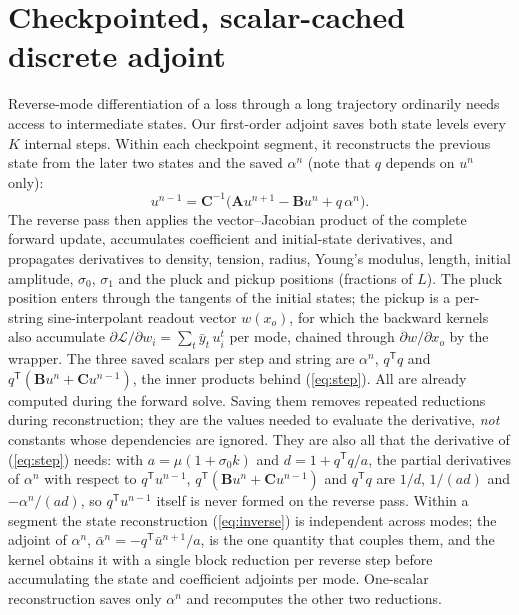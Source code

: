 \documentclass[a4paper,10pt]{article}
\begin{document}
\section{Checkpointed, scalar-cached discrete adjoint}
Reverse-mode differentiation of a loss through a long trajectory ordinarily needs access to intermediate states. Our first-order adjoint saves both state levels every $K$ internal steps. Within each checkpoint segment, it reconstructs the previous state from the later two states and the saved $\alpha^n$ (note that $q$ depends on $u^{n}$ only):
\begin{equation}
 u^{n-1}=\mathbf{C}^{-1}\big(\mathbf{A}u^{n+1}-\mathbf{B}u^{n}+q\,\alpha^n\big).
 \label{eq:inverse}
\end{equation}
The reverse pass then applies the vector--Jacobian product of the complete forward update, accumulates coefficient and initial-state derivatives, and propagates derivatives to density, tension, radius, Young's modulus, length, initial amplitude, $\sigma_0$, $\sigma_1$ and the pluck and pickup positions (fractions of $L$). The pluck position enters through the tangents of the initial states; the pickup is a per-string sine-interpolant readout vector $w(x_o)$, for which the backward kernels also accumulate $\partial\mathcal{L}/\partial w_i=\sum_t\bar y_t\,u_i^t$ per mode, chained through $\partial w/\partial x_o$ by the wrapper. The three saved scalars per step and string are $\alpha^n$, $q^{\mathsf T}q$ and $q^{\mathsf T}(\mathbf{B}u^{n}+\mathbf{C}u^{n-1})$, the inner products behind (\ref{eq:step}). All are already computed during the forward solve. Saving them removes repeated reductions during reconstruction; they are the values needed to evaluate the derivative, \emph{not} constants whose dependencies are ignored. They are also all that the derivative of (\ref{eq:step}) needs: with $a=\mu(1+\sigma_0k)$ and $d=1+q^{\mathsf T}q/a$, the partial derivatives of $\alpha^n$ with respect to $q^{\mathsf T}u^{n-1}$, $q^{\mathsf T}(\mathbf{B}u^{n}+\mathbf{C}u^{n-1})$ and $q^{\mathsf T}q$ are $1/d$, $1/(ad)$ and $-\alpha^n/(ad)$, so $q^{\mathsf T}u^{n-1}$ itself is never formed on the reverse pass. Within a segment the state reconstruction (\ref{eq:inverse}) is independent across modes; the adjoint of $\alpha^n$, $\bar\alpha^n=-q^{\mathsf T}\bar u^{n+1}/a$, is the one quantity that couples them, and the kernel obtains it with a single block reduction per reverse step before accumulating the state and coefficient adjoints per mode. One-scalar reconstruction saves only $\alpha^n$ and recomputes the other two reductions.
\end{document}
